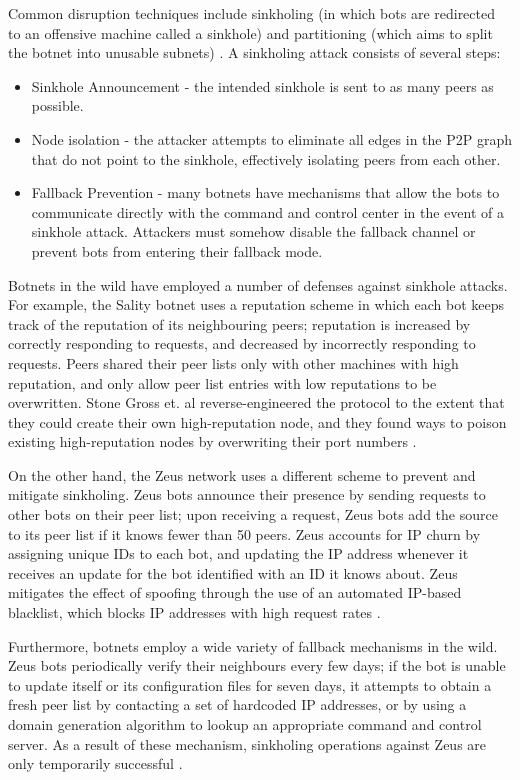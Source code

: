\documentclass{acm_proc_article-sp}
\begin{document}
Common disruption techniques include sinkholing (in which bots are redirected to an offensive machine called a sinkhole) and partitioning (which aims to split the botnet into unusable subnets) \cite{stone:p2p}.  A sinkholing attack consists of several steps:
\begin{itemize}
\item Sinkhole Announcement - the intended sinkhole is sent to as many peers as possible.
\item Node isolation - the attacker attempts to eliminate all edges in the P2P graph that do not point to the sinkhole, effectively isolating peers from each other.
\item Fallback Prevention - many botnets have mechanisms that allow the bots to communicate directly with the command and control center in the event of a sinkhole attack.  Attackers must somehow disable the fallback channel or prevent bots from entering their fallback mode.
\end{itemize}

Botnets in the wild have employed a number of defenses against sinkhole attacks.  For example, the Sality botnet uses a reputation scheme in which each bot keeps track of the reputation of its neighbouring peers; reputation is increased by correctly responding to requests, and decreased by incorrectly responding to requests. Peers shared their peer lists only with other machines with high reputation, and only allow peer list entries with low reputations to be overwritten. Stone Gross et. al reverse-engineered the protocol to the extent that they could create their own high-reputation node, and they found ways to poison existing high-reputation nodes by overwriting their port numbers \cite{stone:p2p}.

On the other hand, the Zeus network uses a different scheme to prevent and mitigate sinkholing. Zeus bots announce their presence by sending requests to other bots on their peer list; upon receiving a request, Zeus bots add the source to its peer list if it knows fewer than 50 peers.  Zeus accounts for IP churn by assigning unique IDs to each bot, and updating the IP address whenever it receives an update for the bot identified with an ID it knows about.  Zeus mitigates the effect of spoofing through the use of an automated IP-based blacklist, which blocks IP addresses with high request rates \cite{stone:p2p}.

Furthermore, botnets employ a wide variety of fallback mechanisms in the wild.  Zeus bots periodically verify their neighbours every few days; if the bot is unable to update itself or its configuration files for seven days, it attempts to obtain a fresh peer list by contacting a set of hardcoded IP addresses, or by using a domain generation algorithm to lookup an appropriate command and control server.  As a result of these mechanism, sinkholing operations against Zeus are only temporarily successful \cite{stone:p2p}.
\end{document}
